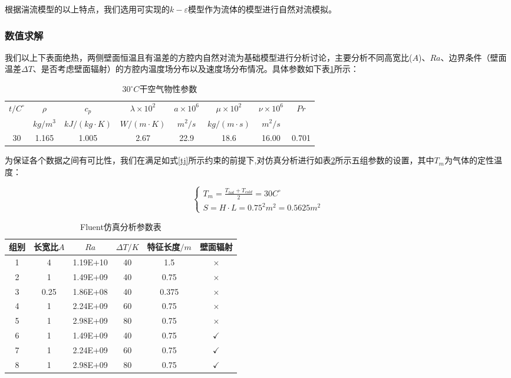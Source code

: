 \documentclass[UTF8]{article} %
\begin{document}
根据湍流模型的以上特点，我们选用可实现的$k-\varepsilon$模型作为流体的模型进行自然对流模拟。

\subsubsection{数值求解}
我们以上下表面绝热，两侧壁面恒温且有温差的方腔内自然对流为基础模型进行分析讨论，主要分析不同高宽比($A$)、$Ra$、边界条件（壁面温差$\Delta T $、是否考虑壁面辐射）的方腔内温度场分布以及速度场分布情况。具体参数如下表\ref{tb:air}所示：

\begin{table}[H]
  \centering
  \caption{$30^{\circ}C$干空气物性参数}
  \begin{tabular}{cccccccc} %
  \toprule
  \multirow{2}{*}{$t/C^{\circ}$} & $\rho$ & $c_p$ & $\lambda \times 10^2 $ & $a \times 10^6 $ &$\mu \times 10^2 $ & $\nu \times 10^6 $& $Pr$ \\
  \cline{2-8}  %
     & $kg/m^3$ & $kJ/(kg \cdot K)$& $W/(m \cdot K)$ & $m^2/s$ & $kg / (m \cdot s)$ & $m^2/s$ & \\
    \midrule
    30 &  1.165 & 1.005  & 2.67 & 22.9  & 18.6 & 16.00 & 0.701 \\
    \bottomrule
    \end{tabular}
    \label{tb:air}
\end{table}

为保证各个数据之间有可比性，我们在满足如式\ref{tj}所示约束的前提下,对仿真分析进行如表\ref{table_time}所示五组参数的设置，其中$T_m$为气体的定性温度：

\begin{equation}
  \label{tj}
  \left\{
  \begin{aligned}
  T_m=\frac{T_{hot}+T_{cold}}{2} = 30 C^{\circ} \\
  S=H \cdot L=0.75^2 m^2=0.5625m^2
  \end{aligned}
  \right.
\end{equation}

\begin{table}[H]  
    \centering
    \caption{Fluent仿真分析参数表}
    \label{table_time}
    \begin{tabular}{cccccc}  
   \toprule   
    组别 & 长宽比$A$ & $Ra$ & $\Delta T/K $ & 特征长度$/m$ & 壁面辐射 \\  
   \midrule   
  1	&	4	&	1.19E+10	&	40	&	1.5	 & $\times$\\
  2	&	1	&	1.49E+09	&	40	&	0.75	& $\times$\\
  3	&	0.25	&	1.86E+08	&	40	&	0.375	& $\times$\\
  4	&	1	&	2.24E+09	&	60	&	0.75	& $\times$\\
  5	&	1	&	2.98E+09	&	80	&	0.75	& $\times$\\  
  6	&	1	&	1.49E+09	&	40	&	0.75	& $\checkmark$\\
  7	&	1	&	2.24E+09	&	60	&	0.75	& $\checkmark$\\ 
  8	&	1	&	2.98E+09	&	80	&	0.75	& $\checkmark$\\ 
    \bottomrule  
   \end{tabular} 
\end{table}
\end{document}
